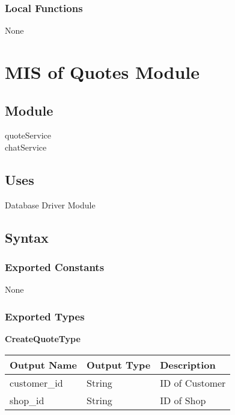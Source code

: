 \documentclass[12pt, titlepage]{article}
\begin{document}
\subsubsection{Local Functions}

None

\newpage

\section{MIS of Quotes Module} \label{mQuotes}
\subsection{Module}

quoteService \\ chatService

\subsection{Uses}

Database Driver Module

\subsection{Syntax}

\subsubsection{Exported Constants}

None

\subsubsection{Exported Types}

\textbf{CreateQuoteType}

\begin{table}[H]
	\begin{tabular}{|p{}|p{}|p{}|}
		\hline
		\textbf{Output Name} & \textbf{Output Type} & \textbf{Description} \\
		\hline
		customer\_id         & String               & ID of Customer       \\
		\hline
		shop\_id             & String               & ID of Shop           \\
		\hline
	\end{tabular}
\end{table}
\end{document}

